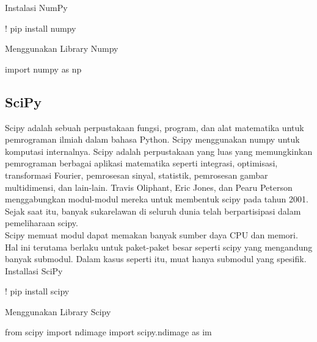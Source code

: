 \documentclass[
  letterpaper,
  DIV=11,
  numbers=noendperiod]{scrreprt}
\newenvironment{Shaded}{\begin{snugshade}}{\end{snugshade}}
\newcommand{\ImportTok}[1]{\textcolor[rgb]{0.00,0.46,0.62}{#1}}
\newcommand{\NormalTok}[1]{\textcolor[rgb]{0.00,0.23,0.31}{#1}}
\newcommand{\OperatorTok}[1]{\textcolor[rgb]{0.37,0.37,0.37}{#1}}
\begin{document}
Instalasi NumPy

\begin{Shaded}
\begin{Highlighting}[]
\OperatorTok{!}\NormalTok{ pip install numpy}
\end{Highlighting}
\end{Shaded}

Menggunakan Library Numpy

\begin{Shaded}
\begin{Highlighting}[]
\ImportTok{import}\NormalTok{ numpy }\ImportTok{as}\NormalTok{ np}
\end{Highlighting}
\end{Shaded}

\hypertarget{scipy}{%
\subsection*{SciPy}\label{scipy}}

Scipy adalah sebuah perpustakaan fungsi, program, dan alat matematika
untuk pemrograman ilmiah dalam bahasa Python. Scipy menggunakan numpy
untuk komputasi internalnya. Scipy adalah perpustakaan yang luas yang
memungkinkan pemrograman berbagai aplikasi matematika seperti integrasi,
optimisasi, transformasi Fourier, pemrosesan sinyal, statistik,
pemrosesan gambar multidimensi, dan lain-lain. Travis Oliphant, Eric
Jones, dan Pearu Peterson menggabungkan modul-modul mereka untuk
membentuk scipy pada tahun 2001. Sejak saat itu, banyak sukarelawan di
seluruh dunia telah berpartisipasi dalam pemeliharaan scipy.\\
Scipy memuat modul dapat memakan banyak sumber daya CPU dan memori. Hal
ini terutama berlaku untuk paket-paket besar seperti scipy yang
mengandung banyak submodul. Dalam kasus seperti itu, muat hanya submodul
yang spesifik.\\
Installasi SciPy

\begin{Shaded}
\begin{Highlighting}[]
\OperatorTok{!}\NormalTok{ pip install scipy}
\end{Highlighting}
\end{Shaded}

Menggunakan Library Scipy

\begin{Shaded}
\begin{Highlighting}[]
\ImportTok{from}\NormalTok{ scipy }\ImportTok{import}\NormalTok{ ndimage}
\ImportTok{import}\NormalTok{ scipy.ndimage }\ImportTok{as}\NormalTok{ im}
\end{Highlighting}
\end{Shaded}
\end{document}

